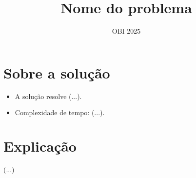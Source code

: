 \documentclass[12pt]{article}
\title{Nome do problema}
\author{OBI 2025}
\date{}
\begin{document}
\maketitle

\section*{Sobre a solução}
\begin{itemize}
    \item A solução resolve (...).
    \item Complexidade de tempo: (...).
\end{itemize}

\section*{Explicação}
(...)
\end{document}
